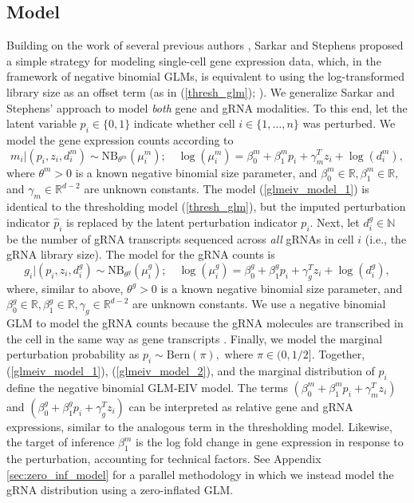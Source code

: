 \documentclass[12pt]{article}
\begin{document}
\subsection{Model}\label{sec:model}
Building on the work of several previous authors \parencite{Townes2019,Svensson2020,Hafemeister2019}, Sarkar and Stephens proposed a simple strategy for modeling single-cell gene expression data, which, in the framework of negative binomial GLMs, is equivalent to using the log-transformed library size as an offset term (as in (\ref{thresh_glm}); \cite{Sarkar2021}). We generalize Sarkar and Stephens' approach to model \textit{both} gene and gRNA modalities. To this end, let the latent variable $p_i \in \{0,1\}$ indicate whether cell $i \in \{1, \dots, n\}$ was perturbed. We model the gene expression counts according to
\begin{equation}\label{glmeiv_model_1}
m_i |(p_i, z_i, d^m_i) \sim \textrm{NB}_{\theta^m}(\mu_i^m); \quad \log(\mu^m_i) = \beta^m_0 + \beta^m_1 p_i + \gamma_m^T z_i + \log(d^m_i),
\end{equation}
where $\theta^m > 0$ is a known negative binomial size parameter, and $\beta^m_0 \in \mathbb{R}, \beta^m_1 \in \mathbb{R},$ and $\gamma_m \in \mathbb{R}^{d - 2}$ are unknown constants. The model (\ref{glmeiv_model_1}) is identical to the thresholding model (\ref{thresh_glm}), but the imputed perturbation indicator $\hat{p}_i$ is replaced by the latent perturbation indicator $p_i$. Next, let $d^g_i \in \mathbb{N}$ be the number of gRNA transcripts sequenced across \textit{all} gRNAs in cell $i$ (i.e., the gRNA library size). The model for the gRNA counts is 
\begin{equation}\label{glmeiv_model_2}
g_i | (p_i, z_i, d^g_i) \sim \textrm{NB}_{\theta^g}\left(\mu_i^g\right); \quad \log(\mu_i^g) = \beta^g_0 + \beta^g_1p_i + \gamma^T_g z_i + \log(d^g_i),
\end{equation}
where, similar to above, $\theta^g > 0$ is a known negative binomial size parameter, and $\beta^g_0 \in \mathbb{R}, \beta^g_1 \in \mathbb{R}, \gamma_g \in \mathbb{R}^{d - 2}$ are unknown constants. We use a negative binomial GLM to model the gRNA counts because the gRNA molecules are transcribed in the cell in the same way as gene transcripts \parencite{Datlinger2017,Hill2018}. Finally, we model the marginal perturbation probability as $
p_i \sim \textrm{Bern}(\pi),$ where $\pi \in (0,1/2]$. 
Together, (\ref{glmeiv_model_1}), (\ref{glmeiv_model_2}), and the marginal distribution of $p_i$ define the negative binomial GLM-EIV model. The terms $(\beta^m_0 + \beta^m_1p_i + \gamma^T_m z_i)$ and $(\beta^g_0 + \beta^g_1 p_i + \gamma^T_g z_i)$ can be interpreted as relative gene and gRNA expressions, similar to the analogous term in the thresholding model. Likewise, the target of inference $\beta^m_1$ is the log fold change in gene expression in response to the perturbation, accounting for technical factors. See Appendix \ref{sec:zero_inf_model} for a parallel methodology in which we instead model the gRNA distribution using a zero-inflated GLM.
\end{document}
